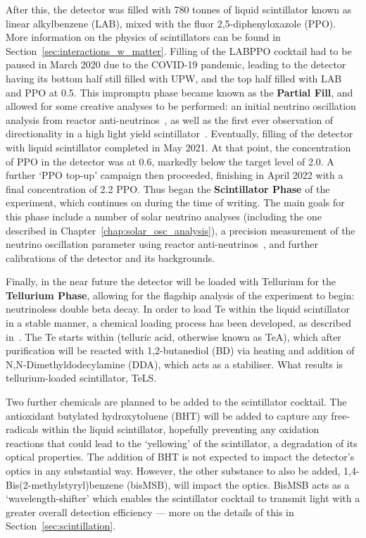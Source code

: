 After this, the detector was filled with 780 tonnes of liquid scintillator known as linear alkylbenzene (LAB), mixed with the fluor 2,5-diphenyloxazole (PPO). More information on the physics of scintillators can be found in Section~\ref{sec:interactions_w_matter}. Filling of the LABPPO cocktail had to be paused in March 2020 due to the COVID-19 pandemic, leading to the detector having its bottom half still filled with UPW, and the top half filled with LAB and PPO at \SI{0.5}{\gpl}. This impromptu phase became known as the \textbf{Partial Fill}, and allowed for some creative analyses to be performed: an initial neutrino oscillation analysis from reactor anti-neutrinos~\cite{morton-blakeFirstMeasurementReactor2021}, %
as well as the first ever observation of directionality in a high light yield scintillator~\cite{patonFirstObservationDirectionality,allegaFirstObservationDirectionality}. %
Eventually, filling of the detector with liquid scintillator completed in May 2021. At that point, the concentration of PPO in the detector was at \SI{0.6}{\gpl}, markedly below the target level of \SI{2.0}{\gpl}. A further `PPO top-up' campaign then proceeded, finishing in April 2022 with a final concentration of \SI{2.2}{\gpl} PPO. Thus began the \textbf{Scintillator Phase} of the experiment, which continues on during the time of writing. The main goals for this phase include a number of solar neutrino analyses (including the one described in Chapter~\ref{chap:solar_osc_analysis}), a precision measurement of the neutrino oscillation parameter \dmsq{} using reactor anti-neutrinos~\cite{morton-blakeFirstMeasurementReactor2021}, %
and further calibrations of the detector and its backgrounds.

Finally, in the near future the detector will be loaded with Tellurium for the \textbf{Tellurium Phase}, allowing for the flagship analysis of the experiment to begin: neutrinoless double beta decay. In order to load Te within the liquid scintillator in a stable manner, a chemical loading process has been developed, as described in~\cite{autyMethodLoadTellurium2023}. %
The Te starts within  (telluric acid, otherwise known as TeA), which after purification will be reacted with 1,2-butanediol (BD) via heating and addition of N,N-Dimethyldodecylamine (DDA), which acts as a stabiliser. What results is tellurium-loaded scintillator, TeLS.

Two further chemicals are planned to be added to the scintillator cocktail. The antioxidant butylated hydroxytoluene (BHT) will be added to capture any free-radicals within the liquid scintillator, hopefully preventing any oxidation reactions that could lead to the `yellowing' of the scintillator, a degradation of its optical properties. The addition of BHT is not expected to impact the detector's optics in any substantial way. However, the other substance to also be added, 1,4-Bis(2-methylstyryl)benzene (bisMSB), will impact the optics. BisMSB acts as a `wavelength-shifter' which enables the scintillator cocktail to transmit light with a greater overall detection efficiency --- more on the details of this in Section~\ref{sec:scintillation}.

